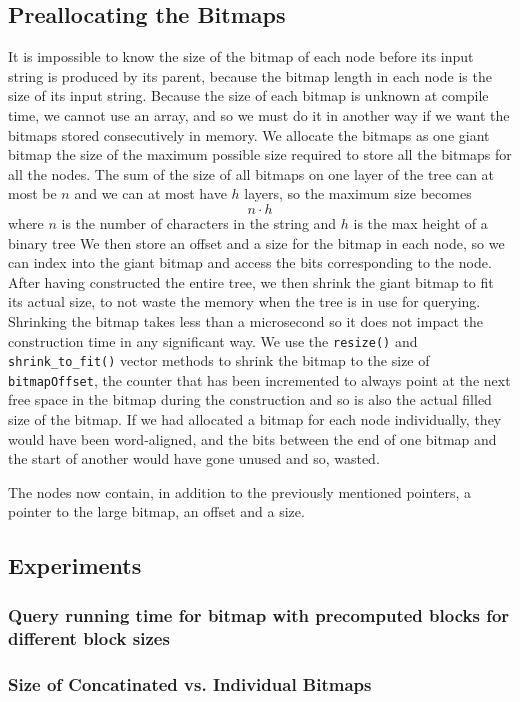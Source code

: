 \subsection{Preallocating the Bitmaps}
It is impossible to know the size of the bitmap of each node before its input string is produced by its parent, because the bitmap length in each node is the size of its input string.
Because the size of each bitmap is unknown at compile time, we cannot use an array, and so we must do it in another way if we want the bitmaps stored consecutively in memory.
We allocate the bitmaps as one giant bitmap the size of the maximum possible size required to store all the bitmaps for all the nodes. The sum of the size of all bitmaps on one layer of the tree can at most be $n$ and we can at most have $h$ layers, so the maximum size becomes
\[n \cdot h\]
where $n$ is the number of characters in the string and $h$ is the max height of a binary tree   We then store an offset and a size for the bitmap in each node, so we can index into the giant bitmap and access the bits corresponding to the node.
After having constructed the entire tree, we then shrink the giant bitmap to fit its actual size, to not waste the memory when the tree is in use for querying. Shrinking the bitmap takes less than a microsecond so it does not impact the construction time in any significant way. We use the \texttt{resize()} and \texttt{shrink\_to\_fit()} vector methods to shrink the bitmap to the size of \texttt{bitmapOffset}, the counter that has been incremented to always point at the next free space in the bitmap during the construction and so is also the actual filled size of the bitmap.
If we had allocated a bitmap for each node individually, they would have been word-aligned, and the bits between the end of one bitmap and the start of another would have gone unused and so, wasted.

The nodes now contain, in addition to the previously mentioned pointers, a pointer to the large bitmap, an offset and a size.

\subsection{Experiments}
\subsubsection{Query running time for bitmap with precomputed blocks for different block sizes}

\subsubsection{Size of Concatinated vs. Individual Bitmaps}